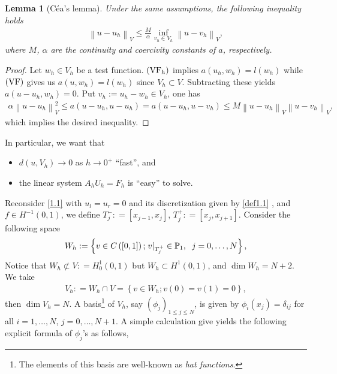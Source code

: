 \documentclass[11pt,a4paper,center,notitlepage]{article}
\numberwithin{equation}{section}
\newtheorem{lemma}{Lemma}[section]
\begin{document}
\begin{lemma}[C\'ea's lemma]
Under the same assumptions, the following inequality holds
\begin{align}
{\left\| {u - {u_h}} \right\|_V} \le \frac{M}{\alpha }\mathop {\inf }\limits_{{v_h} \in {V_h}} {\left\| {u - {v_h}} \right\|_V},
\end{align}
where $M$, $\alpha$ are the continuity and coercivity constants of $a$, respectively.
\end{lemma}

\begin{proof}
Let $w_h\in V_h$ be a test function. $\left( {\rm VF}_h \right)$ implies $a\left( {{u_h},{w_h}} \right) = l\left( {{w_h}} \right)$ while $\left({\rm VF}\right)$ gives us $a\left( {u,{w_h}} \right) = l\left( {{w_h}} \right)$ since $V_h\subset V$. Subtracting these yields $a\left( {u - {u_h},{w_h}} \right) = 0$. Put $v_h:=u_h-w_h\in V_h$, one has
\begin{align}
\alpha \left\| {u - {u_h}} \right\|_V^2 \le a\left( {u - {u_h},u - {u_h}} \right) = a\left( {u - {u_h},u - {v_h}} \right) \le M{\left\| {u - {u_h}} \right\|_V}{\left\| {u - {v_h}} \right\|_V},
\end{align}
which implies the desired inequality.
\end{proof}
In particular, we want that
\begin{itemize}
\item $d\left(u,V_h\right) \to 0$ as $h\to 0^+$ ``fast'', and
\item the linear system $A_h U_h=F_h$ is ``easy'' to solve.
\end{itemize}
Reconsider \eqref{1.1} with $u_l=u_r=0$ and its discretization given by \ref{def1.1} , and $f\in H^{-1}\left(0,1\right)$, we define $T_j^ - : = \left[ {{x_{j - 1}},{x_j}} \right]$, $T_j^ + : = \left[ {{x_j},{x_{j + 1}}} \right]$. Consider the following space
\begin{align}
{W_h}: = \left\{ {v \in C\left( {\left[ {0,1} \right]} \right);{{\left. v \right|}_{T_j^ + }} \in {\mathbb{P}_1},\hspace{2mm} j = 0, \ldots ,N} \right\},
\end{align}
Notice that ${W_h} \not\subset V: = H_0^1\left( {0,1} \right)$ but $W_h \subset H^1\left(0,1\right)$, and $\dim W_h = N+2$. We take
\begin{align}
\label{1.52}
{V_h}: = {W_h} \cap V = \left\{ {v \in {W_h};v\left( 0 \right) = v\left( 1 \right) = 0} \right\}, 
\end{align}
then $\dim V_h=N$. A basis\footnote{The elements of this basis are well-known as \textit{hat functions}.} of $V_h$, say  ${\left( {{\phi _j}} \right)_{1 \le j \le N}}$, is given by $\phi _i \left(x_j\right) =\delta _{ij}$ for all $i=1,\ldots ,N$, $j=0,\ldots,N+1$. A simple calculation give yields the following explicit formula of $\phi_j$'s as follows,
\end{document}

